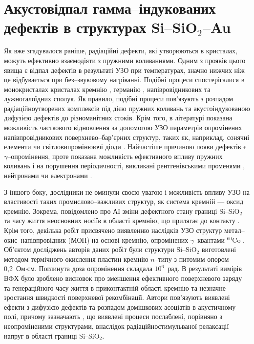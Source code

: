 \documentclass[a4paper,14pt,oneside,openany]{memoir}
\begin{document}
\section{Акустовідпал гамма--індукованих дефектів в структурах Si--SiO$_2$--Au}

Як вже згадувалося раніше, радіаційні дефекти, які утворюються в кристалах, можуть ефективно взаємодіяти з пружними коливаннями.
Одним з проявів цього явища є відпал дефектів в результаті УЗО при температурах, значно нижчих ніж це відбувається при без--звуковому нагріванні.
Подібні процеси спостерігалися в монокристалах кристалах кремнію \cite{OstrovRadSi,Podolian2012r,PodolHivr,YOlikh2007TPLr}, германію \cite{Olikh:FTP1996}, 
напівровідникових \cite{OlikhProc,OstrovFTTRad} та лужногалоїдних \cite{UST:OstrovCsI} сполук.
Як правило, подібні процеси пов'язують з розпадом радіаційноутворених комплексів під дією пружних коливань та акустоіндукованою дифузією дефектів до різноманітних стоків.
Крім того, в літературі показана можливість часткового відновлення за допомогою УЗО параметрів опромінених напівпровідникових поверхнево--бар'єрних структур, таких як, наприклад,
сонячні елементи \cite{YOlikh2007TPLr} чи світловипромінюючі діоди \cite{US:LED,UST:LED_SM}.
Найчастіше причиною появи дефектів є $\gamma$--опромінення, проте показана можливість ефективного впливу пружних коливань і на порушення періодичності, викликані
рентгенівськими променями \cite{UST:OstrovCsI}, нейтронами \cite{Olikh:FTP1996} чи електронами \cite{US:LED,UST:LED_SM}.

З іншого боку, дослідники не оминули своєю увагою і можливість впливу УЗО на властивості таких промислово--важливих структур, як система 
кремній --- оксид кремнію.
Зокрема, повідомлено про АІ зміни дефектного стану границі  Si--SiO$_2$ \cite{Ostap:SiO2,UST:Medvid,Zaver:2008r} та часу життя неосновних носіїв в області кремнію,
що прилягає до контакту \cite{Parchinskii2003r}.
Крім того, декілька робіт присвячено виявленню наслідків УЗО структур метал--окис--напівпровідник (МОН) на основі кремнію, опромінених $\gamma$--квантами $^{60}$Co \cite{Parchinskii2000r,Parchinskii2006r}.
Об'єктом досліджень авторів даних робіт були структури Si--SiO$_2$ виготовлені методом термічного окислення пластин кремнію $n$--типу з питомим опором 0,2~Ом$\cdot$см.
Поглинута доза опромінення складала $10^6$~рад.
В результаті вимірів ВФХ було зроблено висновок про зменшення ефективного поверхневого заряду та генераційного часу життя в приконтактній області кремнію та незначне
зростання швидкості поверхневої рекомбінації.
Автори пов'язують виявлені ефекти з дифузією дефектів та розпадом домішкових асоціатів в акустичному полі, причому зазначають , що виявлені процеси 
послаблені, порівняно з неопроміненими структурами, внаслідок радіаційностимульваної релаксації напруг в області границі Si--SiO$_2$.
\end{document}
